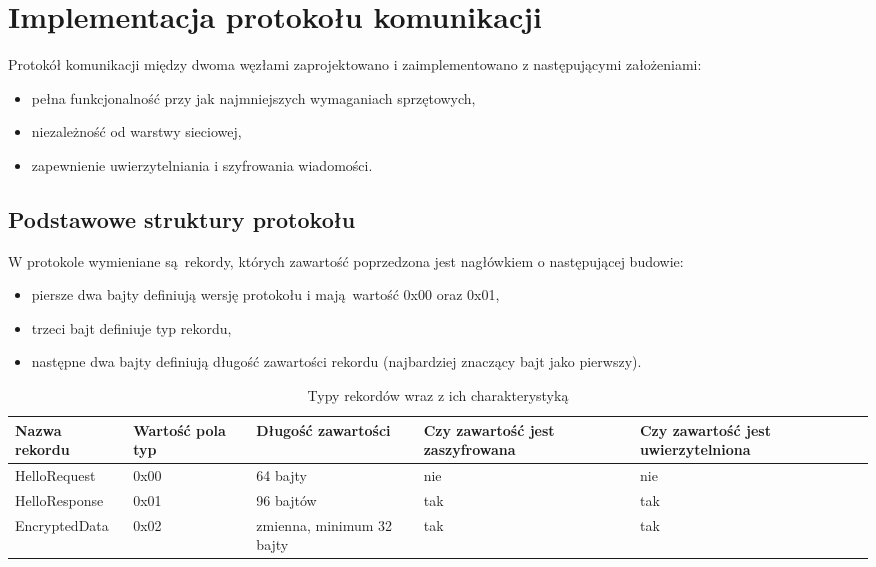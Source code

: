 \chapter{Implementacja protokołu komunikacji}
\label{cha:implementacja}

Protokół komunikacji między dwoma węzłami zaprojektowano i zaimplementowano z następującymi założeniami:

\begin{itemize}
\item pełna funkcjonalność przy jak najmniejszych wymaganiach sprzętowych,
\item niezależność od warstwy sieciowej,
\item zapewnienie uwierzytelniania i szyfrowania wiadomości.
\end{itemize}

\section{Podstawowe struktury protokołu}
\label{sec:proto}

W protokole wymieniane są rekordy, których zawartość poprzedzona jest nagłówkiem o następującej budowie:

\begin{itemize}
\item piersze dwa bajty definiują wersję protokołu i mają wartość 0x00 oraz 0x01,
\item trzeci bajt definiuje typ rekordu,
\item następne dwa bajty definiują długość zawartości rekordu (najbardziej znaczący bajt jako pierwszy).
\end{itemize}

\begin{table}[t]
\centering
\begin{tabular}{|l|p{1.4cm}|l|p{2.9cm}|p{3.1cm}|}
    \hline
    \textbf{Nazwa rekordu}  &
    \textbf{Wartość pola typ}  &
    \textbf{Długość zawartości}  &
    \textbf{Czy zawartość jest zaszyfrowana}  &
    \textbf{Czy zawartość jest uwierzytelniona}\\
    \hline
    HelloRequest & 0x00 & 64 bajty & nie & nie\\
    \hline
    HelloResponse & 0x01 & 96 bajtów & tak & tak\\
    \hline
    EncryptedData & 0x02 & zmienna, minimum 32 bajty & tak & tak\\
    \hline
\end{tabular}
\caption{Typy rekordów wraz z ich charakterystyką}
\label{tab:recordtypes}
\end{table}


